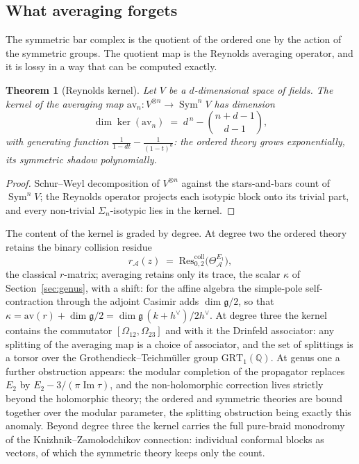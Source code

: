 \documentclass[11pt]{amsart}
\numberwithin{equation}{section}
\theoremstyle{plain}
\newtheorem{theorem}{Theorem}[section]
\theoremstyle{definition}
\theoremstyle{remark}
\newcommand{\cA}{\mathcal{A}}
\newcommand{\bQ}{\mathbb{Q}}
\newcommand{\fg}{\mathfrak{g}}
\newcommand{\dvee}{h^{\vee}}
\begin{document}
\subsection{What averaging forgets}

The symmetric bar complex is the quotient of the ordered one by the action
of the symmetric groups. The quotient map is the Reynolds averaging
operator, and it is lossy in a way that can be computed exactly.

\begin{theorem}[Reynolds kernel]\label{thm:reynolds}
Let $V$ be a $d$-dimensional space of fields. The kernel of the averaging
map $\mathrm{av}_n\colon V^{\otimes n}\to\operatorname{Sym}^{n}V$ has
dimension
\begin{equation}
\dim\ker(\mathrm{av}_n)\;=\;d^{\,n}-\binom{n+d-1}{d-1},
\end{equation}
with generating function $\frac{1}{1-dt}-\frac{1}{(1-t)^{d}}$: the ordered
theory grows exponentially, its symmetric shadow polynomially.
\end{theorem}

\begin{proof}
Schur--Weyl decomposition of $V^{\otimes n}$ against the stars-and-bars
count of $\operatorname{Sym}^{n}V$; the Reynolds operator projects each
isotypic block onto its trivial part, and every non-trivial
$\Sigma_n$-isotypic lies in the kernel.
\end{proof}

The content of the kernel is graded by degree. At degree two the ordered
theory retains the binary collision residue
\begin{equation}\label{eq:rmatrix}
r_{\cA}(z)\;=\;\mathrm{Res}^{\mathrm{coll}}_{0,2}\bigl(\Theta^{E_1}_{\cA}\bigr),
\end{equation}
the classical $r$-matrix; averaging retains only its trace, the scalar
$\kappa$ of Section~\ref{sec:genus}, with a shift: for the affine algebra
the simple-pole self-contraction through the adjoint Casimir adds
$\dim\fg/2$, so that
$\kappa=\mathrm{av}(r)+\dim\fg/2=\dim\fg\,(k+\dvee)/2\dvee$. At degree
three the kernel contains the commutator $[\Omega_{12},\Omega_{23}]$ and
with it the Drinfeld associator: any splitting of the averaging map is a
choice of associator, and the set of splittings is a torsor over the
Grothendieck--Teichm\"uller group $\mathrm{GRT}_1(\bQ)$. At genus one a
further obstruction appears: the modular completion of the propagator
replaces $E_2$ by $E_2-3/(\pi\operatorname{Im}\tau)$, and the
non-holomorphic correction lives strictly beyond the holomorphic
theory; the ordered and
symmetric theories are bound together over the modular parameter,
the splitting obstruction being exactly this anomaly. Beyond degree
three the kernel carries the full pure-braid monodromy of the
Knizhnik--Zamolodchikov connection: individual conformal blocks as
vectors, of which the symmetric theory keeps only the count.
\end{document}
